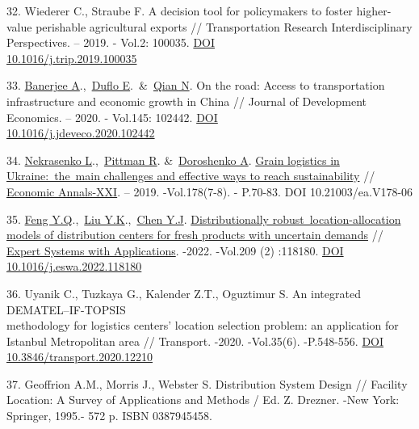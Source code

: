 \begin{references}
32. Wiederer C., Straube F. A decision tool for policymakers to foster
higher-value perishable agricultural exports // Transportation
Research Interdisciplinary Perspectives. -- 2019. - Vol.2: 100035.
\href{https://doi.org/10.1016/j.trip.2019.100035}{DOI\\
10.1016/j.trip.2019.100035}

33. \href{https://www.webofscience.com/wos/author/record/34283995}{Banerjee
A}.,~\href{https://www.webofscience.com/wos/author/record/7546927}{Duflo
E}.~\&~\href{https://www.webofscience.com/wos/author/record/27141385}{Qian
N}. On the road: Access to transportation infrastructure and economic
growth in China // Journal of Development Economics. -- 2020. -
Vol.145: 102442.
\href{https://doi.org/10.1016/j.jdeveco.2020.102442}{DOI\\
10.1016/j.jdeveco.2020.102442}

34. \href{https://www.webofscience.com/wos/author/record/1406264}{Nekrasenko
L}.,~\href{https://www.webofscience.com/wos/author/record/30670921}{Pittman
R}.
\&~\href{https://www.webofscience.com/wos/author/record/29112586}{Doroshenko
A}.
\href{https://www.webofscience.com/wos/woscc/full-record/WOS:000530138400006}{Grain
logistics in Ukraine:~the~main challenges and effective ways to reach
sustainability} // \href{javascript:void(0)}{Economic Annals-XXI}. --
2019. -Vol.178(7-8). - P.70-83. DOI 10.21003/ea.V178-06

35. \href{https://www.webofscience.com/wos/author/record/34864370}{Feng
Y.Q}.,~\href{https://www.webofscience.com/wos/author/record/33997583}{Liu
Y.K}.,~\href{https://www.webofscience.com/wos/author/record/34807908}{Chen
Y.J}.
\href{https://www.webofscience.com/wos/woscc/full-record/WOS:000859686100002}{Distributionally
robust~location-allocation models of distribution centers for fresh
products with uncertain demands} //
\href{https://www.sciencedirect.com/journal/expert-systems-with-applications}{Expert
Systems with Applications}. -2022. -Vol.209 (2) :118180.
\href{https://doi.org/10.1016/j.eswa.2022.118180}{DOI
10.1016/j.eswa.2022.118180}

36. Uyanik C., Tuzkaya G., Kalender Z.T., Oguztimur S. An integrated
DEMATEL--IF-TOPSIS \\methodology for logistics centers' location
selection problem: an application for Istanbul Metropolitan area //
Transport. -2020. -Vol.35(6). -P.548-556.
\href{https://doi.org/10.3846/transport.2020.12210}{DOI
10.3846/transport.2020.12210}

37. Geoffrion A.M., Morris J., Webster S. Distribution System Design //
Facility Location: A Survey of Applications and Methods / Ed. Z.
Drezner. -New York: Springer, 1995.- 572 p. ISBN 0387945458.
\end{references}

